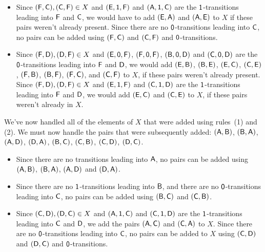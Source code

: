 \begin{itemize}
\item Since $(\mathsf{F},\mathsf{C}),(\mathsf{C},\mathsf{F})\in X$ and $(\mathsf{E},\mathsf{1},\mathsf{F})$
  and $(\mathsf{A},\mathsf{1},\mathsf{C})$ are the $\mathsf{1}$-transitions leading into
  $\mathsf{F}$ and $\mathsf{C}$, we would have to add $(\mathsf{E},\mathsf{A})$ and
  $(\mathsf{A},\mathsf{E})$ to $X$ if these pairs weren't already present.  Since
  there are no $\mathsf{0}$-transitions leading into $\mathsf{C}$, no pairs can
  be added using $(\mathsf{F},\mathsf{C})$ and $(\mathsf{C},\mathsf{F})$ and
  $\mathsf{0}$-transitions.

\item Since $(\mathsf{F},\mathsf{D}),(\mathsf{D},\mathsf{F})\in X$ and $(\mathsf{E},\mathsf{0},\mathsf{F})$,
  $(\mathsf{F},\mathsf{0},\mathsf{F})$, $(\mathsf{B},\mathsf{0},\mathsf{D})$ and
  $(\mathsf{C},\mathsf{0},\mathsf{D})$ are the $\mathsf{0}$-transitions leading into
  $\mathsf{F}$ and $\mathsf{D}$, we would add $(\mathsf{E},\mathsf{B})$, $(\mathsf{B},\mathsf{E})$,
  $(\mathsf{E},\mathsf{C})$, $(\mathsf{C},\mathsf{E})$, $(\mathsf{F},\mathsf{B})$, $(\mathsf{B},\mathsf{F})$,
  $(\mathsf{F},\mathsf{C})$, and $(\mathsf{C},\mathsf{F})$ to $X$, if these pairs weren't
  already present.  Since $(\mathsf{F},\mathsf{D}),(\mathsf{D},\mathsf{F})\in X$ and
  $(\mathsf{E},\mathsf{1},\mathsf{F})$ and $(\mathsf{C},\mathsf{1},\mathsf{D})$ are the
  $\mathsf{1}$-transitions leading into $\mathsf{F}$ and $\mathsf{D}$, we would add
  $(\mathsf{E},\mathsf{C})$ and $(\mathsf{C},\mathsf{E})$ to $X$, if these pairs weren't
  already in $X$.
\end{itemize}

We've now handled all of the elements of $X$ that were added using
rules~(1) and (2).  We must now handle the pairs that were
subsequently added: $(\mathsf{A},\mathsf{B})$, $(\mathsf{B},\mathsf{A})$, $(\mathsf{A},\mathsf{D})$,
$(\mathsf{D},\mathsf{A})$, $(\mathsf{B},\mathsf{C})$, $(\mathsf{C},\mathsf{B})$, $(\mathsf{C},\mathsf{D})$,
$(\mathsf{D},\mathsf{C})$.
\begin{itemize}
\item Since there are no transitions leading into $\mathsf{A}$, no pairs can
  be added using $(\mathsf{A},\mathsf{B})$, $(\mathsf{B},\mathsf{A})$, $(\mathsf{A},\mathsf{D})$ and
  $(\mathsf{D},\mathsf{A})$.

\item Since there are no $\mathsf{1}$-transitions leading into $\mathsf{B}$, and
  there are no $\mathsf{0}$-transitions leading into $\mathsf{C}$, no pairs can
  be added using $(\mathsf{B},\mathsf{C})$ and $(\mathsf{C},\mathsf{B})$.

\item Since $(\mathsf{C},\mathsf{D}), (\mathsf{D},\mathsf{C})\in X$ and $(\mathsf{A},\mathsf{1},\mathsf{C})$
  and $(\mathsf{C},\mathsf{1},\mathsf{D})$ are the $\mathsf{1}$-transitions leading into
  $\mathsf{C}$ and $\mathsf{D}$, we add the pairs {$(\mathsf{A},\mathsf{C})$ and $(\mathsf{C},\mathsf{A})$
    to $X$}.  Since there are no $\mathsf{0}$-transitions leading into
  $\mathsf{C}$, no pairs can be added to $X$ using $(\mathsf{C},\mathsf{D})$ and
  $(\mathsf{D},\mathsf{C})$ and $\mathsf{0}$-transitions.
\end{itemize}


